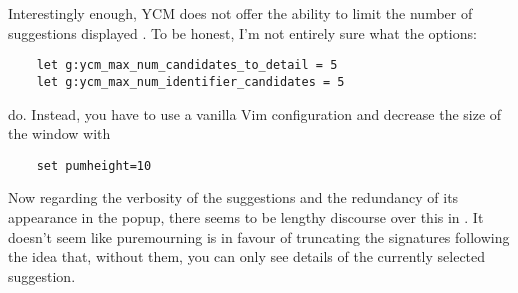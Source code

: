 Interestingly enough, YCM does not offer the
ability to limit the number of suggestions displayed \cite{ioeric2019size}. To
be honest, I'm not entirely sure what the options:
\begin{lstlisting}
    let g:ycm_max_num_candidates_to_detail = 5
    let g:ycm_max_num_identifier_candidates = 5
\end{lstlisting}
do. Instead, you have to use a vanilla Vim configuration and decrease the size
of the window with
\begin{lstlisting}
    set pumheight=10
\end{lstlisting}
Now regarding the verbosity of the suggestions and the redundancy of its
appearance in the popup, there seems to be lengthy discourse over this in
\cite{dhleong2019abbreviate}. It doesn't seem like puremourning is in favour of
truncating the signatures following the idea that, without them, you can only
see details of the currently selected suggestion.

